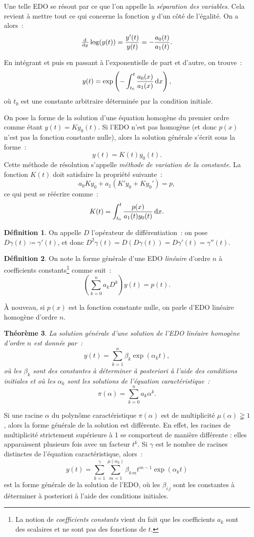 \documentclass{article}
\newtheorem{thm}{Théorème}[section]
\theoremstyle{definition}
\newtheorem{déf}[thm]{Définition}
\theoremstyle{remark}
\begin{document}
		Une telle EDO se résout par ce que l'on appelle la \emph{séparation des variables}. Cela revient à mettre tout ce qui concerne la fonction $y$ d'un
		côté de l'égalité. On a alors~:
		\[\od {}y\log(y(t)) = \frac {y'(t)}{y(t)} = -\frac {a_0(t)}{a_1(t)}.\]

		En intégrant et puis en passant à l'exponentielle de part et d'autre, on trouve~:
		\[y(t) = \exp\left(-\int_{t_0}^t\frac {a_0(x)}{a_1(x)}\dif x\right),\]
		où $t_0$ est une constante arbitraire déterminée par la condition initiale.

		On pose la forme de la solution d'une équation homogène du premier ordre comme étant $y(t) = Ky_0(t)$. Si l'EDO n'est pas homogène (et donc $p(x)$ n'est
		pas la fonction constante nulle), alors la solution générale s'écrit sous la forme~:
		\[y(t) = K(t)y_0(t).\]
		Cette méthode de résolution s'appelle \emph{méthode de variation de la constante}.
		La fonction $K(t)$ doit satisfaire la propriété suivante~:
		\[a_0Ky_0 + a_1(K'y_0 + Ky_0') = p,\]
		ce qui peut se réécrire comme~:
		\[K(t) = \int_{t_0}^t\frac {p(x)}{a_1(t)y_0(t)}\dif x.\]

		\begin{déf} On appelle $D$ l'opérateur de différentiation~: on pose $D\gamma(t) \coloneqq \gamma'(t)$, et donc
		$D^2\gamma(t) = D(D\gamma(t)) = D\gamma'(t) = \gamma''(t)$.
		\end{déf}

		\begin{déf} On note la forme générale d'une EDO \emph{linéaire} d'ordre $n$ à coefficients constants\footnote{La notion de \emph{coefficients constants}
		vient du fait que les coefficients $a_k$ sont des scalaires et ne sont pas des fonctions de $t$.} comme suit~:
		\[\left(\sum_{k=0}^na_kD^k\right)y(t) = p(t).\]

		À nouveau, si $p(x)$ est la fonction constante nulle, on parle d'EDO linéaire homogène d'ordre $n$.
		\end{déf}

		\begin{thm} La solution générale d'une solution de l'EDO linéaire homogène d'ordre $n$ est donnée par~:
		\[y(t) = \sum_{k=1}^n\beta_k\exp(\alpha_kt),\]
		où les $\beta_k$ sont des constantes à déterminer à posteriori à l'aide des conditions initiales et où les $\alpha_k$ sont les solutions de l'équation
		caractéristique~:
		\[\pi(\alpha) = \sum_{k=0}^na_k\alpha^k.\]
		\end{thm}

		Si une racine $\alpha$ du polynôme caractéristique $\pi(\alpha)$ est de multiplicité $\mu(\alpha) \gneqq 1$, alors la forme générale de la solution est
		différente. En effet, les racines de multiplicité strictement supérieure à 1 se comportent de manière différente : elles apparaissent plusieurs fois
		avec un facteur $t^k$. Si $\gamma$ est le nombre de racines distinctes de l'équation caractéristique, alors~:
		\[y(t) = \sum_{k=1}^\gamma\sum_{m=1}^{\mu(\alpha_k)}\beta_{k\,m}t^{m-1}\exp(\alpha_kt)\]
		est la forme générale de la solution de l'EDO, où les $\beta_{i\,j}$ sont les constantes à déterminer à posteriori à l'aide des conditions initiales.
\end{document}
